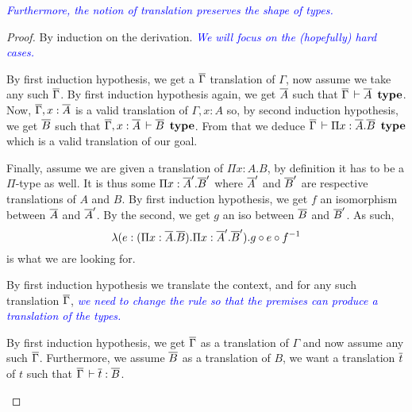 \documentclass{amsart}
\newcommand\meta[1]{\noindent\textcolor{blue}{\emph{#1}}}
\begin{document}
\meta{Furthermore, the notion of \emph{translation} preserves the shape of
types.}

\begin{proof}
  By induction on the derivation.
  \meta{We will focus on the (hopefully) hard cases.}
  \begin{caselist}
    \nextcase
    \begin{mathc}
    \end{mathc}
    By first induction hypothesis, we get a $\overline{\Gamma}$ translation of $\Gamma$,
    now assume we take any such $\overline{\Gamma}$.
    By first induction hypothesis again, we get $\overline{A}$ such that
    $\overline{\Gamma} \,\vdash \overline{A}\ \operatorname{\mathbf{type}}$.
    Now, $\overline{\Gamma}, x:\overline{A}$ is a valid translation of $\Gamma, x:A$ so,
    by second induction hypothesis, we get $\overline{B}$ such that
    $\overline{\Gamma}, x:\overline{A} \,\vdash \overline{B}\ \operatorname{\mathbf{type}}$.
    From that we deduce $\barG \der \Pi x:\barA.\barB\ \type$ which is a valid
    translation of our goal.

    Finally, assume we are given a translation of $\Pi x:A.B$, by definition
    it has to be a $\Pi$-type as well. It is thus some $\Pi x:\overline{A}'.\overline{B}'$
    where $\overline{A}'$ and $\overline{B}'$ are respective translations of $A$ and $B$.
    By first induction hypothesis, we get $f$ an isomorphism between $\overline{A}$
    and $\overline{A}'$. By the second, we get $g$ an iso between $\overline{B}$ and $\overline{B}'$.
    As such,
    \begin{equation*}
    \lambda (e:(\Pi x:\overline{A}.\overline{B}).\Pi x:\overline{A}'.\overline{B}'). g \circ e \circ f^{-1}
    \end{equation*}
    is what we are looking for.

    \nextcase
    \begin{mathc}
    \end{mathc}
    By first induction hypothesis we translate the context, and for any such
    translation $\overline{\Gamma}$, \meta{we need to change the rule so that the premises
    can produce a translation of the types.}

    \nextcase
    \begin{mathc}
    \end{mathc}
    By first induction hypothesis, we get $\overline{\Gamma}$ as a translation of $\Gamma$
    and now assume any such $\overline{\Gamma}$. Furthermore, we assume $\overline{B}$ as a
    translation of $B$, we want a translation $\overline{t}$ of $t$ such that
    $\overline{\Gamma} \,\vdash \overline{t} : \overline{B}$.


\end{caselist}
\end{proof}
\end{document}
